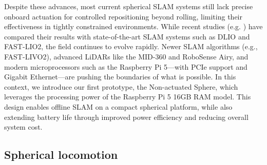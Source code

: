 \documentclass[conference]{IEEEtran}
\begin{document}
\hspace*{1em}Despite these advances, most current spherical SLAM systems still lack precise onboard actuation for controlled repositioning beyond rolling, limiting their effectiveness in tightly constrained environments. While recent studies (e.g. \cite{Kalman_filter_sphere}) have compared their results with state-of-the-art SLAM systems such as DLIO\cite{dlio} and FAST-LIO2\cite{fastlio2}, the field continues to evolve rapidly. Newer SLAM algorithms (e.g., FAST-LIVO2\cite{fastlivo2}), advanced LiDARs like the MID-360 and RoboSense Airy, and modern microprocessors such as the Raspberry Pi 5—with PCIe support and Gigabit Ethernet—are pushing the boundaries of what is possible. In this context, we introduce our first prototype, the Non-actuated Sphere, which leverages the processing power of the Raspberry Pi 5 16GB RAM model. This design enables offline SLAM on a compact spherical platform, while also extending battery life through improved power efficiency and reducing overall system cost.
\subsection{Spherical locomotion}

\label{sec:state-of-the-art}
\end{document}
